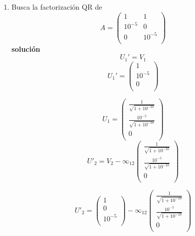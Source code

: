 \begin{enumerate}

\item Busca la factorización QR de 
    \[
        A =
            \left( {\begin{array}{cc}
                1 & 1\\
                10^{-5} & 0 \\
                0 & 10^{-5}\\
            \end{array} } \right)
        \]
    \textbf{solución}
    $$U_{1}' = V_{1}$$
    \[
        U_{1}' =
            \left( {\begin{array}{c}
                1\\
                10^{-5} \\
                0 \\
            \end{array} } \right)
        \]
    
     \[
        U_{1} =
            \left( {\begin{array}{c}
                \frac{1}{\sqrt{1+10^{-10}}}\\
                \frac{10^{-5}}{\sqrt{1+10^{-10}}}\\
                0 \\
            \end{array} } \right)
        \]
    $$U'_{2} = V_{2} - \infty_{12}\left( {\begin{array}{c}
                \frac{1}{\sqrt{1+10^{-10}}}\\
                \frac{10^{-5}}{\sqrt{1+10^{-10}}}\\
                0 \\
            \end{array} } \right)$$
    
    $$U'_{2} = \left( {\begin{array}{c}
                1\\
                0\\
                10^{-5} \\
            \end{array} } \right) - \infty_{12}\left( {\begin{array}{c}
                \frac{1}{\sqrt{1+10^{-10}}}\\
                \frac{10^{-5}}{\sqrt{1+10^{-10}}}\\
                0 \\
            \end{array} } \right)$$
    

\end{enumerate}
